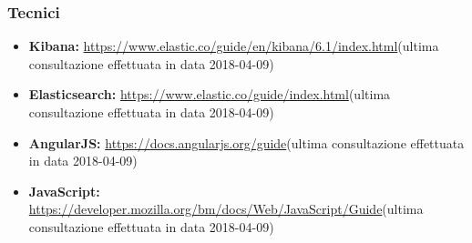 		\subsubsection{Tecnici} 
			\begin{itemize}
				\item \textbf{Kibana:} \href{https://www.elastic.co/guide/en/kibana/6.1/index.html}{https://www.elastic.co/guide/en/kibana/6.1/index.html}(ultima consultazione effettuata in data 2018-04-09)
				\item \textbf{Elasticsearch:} \href{https://www.elastic.co/guide/index.html}{https://www.elastic.co/guide/index.html}(ultima consultazione effettuata in data 2018-04-09)
				\item \textbf{AngularJS:} \href{https://docs.angularjs.org/guide}{https://docs.angularjs.org/guide}(ultima consultazione effettuata in data 2018-04-09)
				\item \textbf{JavaScript:} \href{https://developer.mozilla.org/bm/docs/Web/JavaScript/Guide}{https://developer.mozilla.org/bm/docs/Web/JavaScript/Guide}(ultima consultazione effettuata in data 2018-04-09)
			\end{itemize}